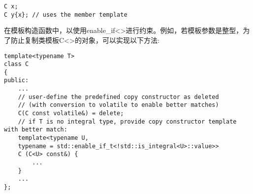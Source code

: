 \begin{lstlisting}[style=styleCXX]
C x;
C y{x}; // uses the member template
\end{lstlisting}

在模板构造函数中，以使用enable\_if<>进行约束。例如，若模板参数是整型，为了防止复制类模板C<>的对象，可以实现以下方法:

\begin{lstlisting}[style=styleCXX]
template<typename T>
class C
{
public:
	...
	// user-define the predefined copy constructor as deleted
	// (with conversion to volatile to enable better matches)
	C(C const volatile&) = delete;
	// if T is no integral type, provide copy constructor template with better match:
	template<typename U,
	typename = std::enable_if_t<!std::is_integral<U>::value>>
	C (C<U> const&) {
		...
	}
	...
};
\end{lstlisting}












